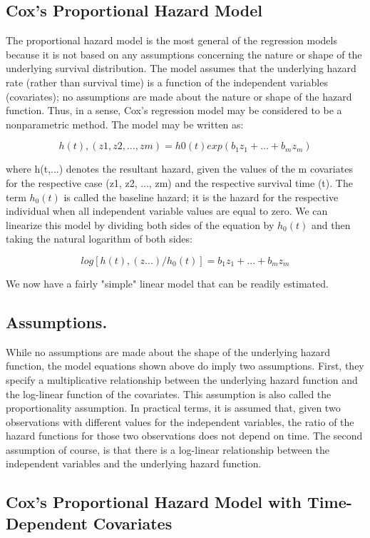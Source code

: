 \documentclass[11pt]{article} %
\begin{document}
\subsection{Cox's Proportional Hazard Model}

The proportional hazard model is the most general of the regression models because it is not based on any assumptions concerning the nature or shape of the underlying survival distribution. The model assumes that the underlying hazard rate (rather than survival time) is a function of the independent variables (covariates); no assumptions are made about the nature or shape of the hazard function. Thus, in a sense, Cox's regression model may be considered to be a nonparametric method. The model may be written as:

\[ h{(t), (z1, z2, \ldots, zm)} = h0(t)exp(b_1z_1 + \ldots + b_mz_m)\]

where h(t,...) denotes the resultant hazard, given the values of the m covariates for the respective case (z1, z2, ..., zm) and the respective survival time (t). The term $h_0(t)$ is called the baseline hazard; it is the hazard for the respective individual when all independent variable values are equal to zero. We can linearize this model by dividing both sides of the equation by $h_0(t)$ and then taking the natural logarithm of both sides:

\[log[h{(t), (z...)}/h_0(t)] = b_1z_1 + ... + b_mz_m\]

We now have a fairly "simple" linear model that can be readily estimated.

\subsection{Assumptions.} While no assumptions are made about the shape of the underlying hazard function, the model equations shown above do imply two assumptions. First, they specify a multiplicative relationship between the underlying hazard function and the log-linear function of the covariates. This assumption is also called the proportionality assumption. In practical terms, it is assumed that, given two observations with different values for the independent variables, the ratio of the hazard functions for those two observations does not depend on time. The second assumption of course, is that there is a log-linear relationship between the independent variables and the underlying hazard function.

\subsection{Cox's Proportional Hazard Model with Time-Dependent Covariates}
\end{document}
